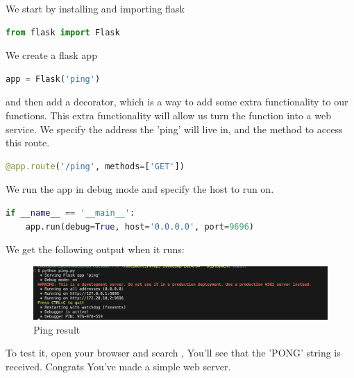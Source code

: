 \documentclass[letterpaper,12pt,notitlepage,twoside]{report}
\begin{document}
We start by installing and importing flask
\begin{lstlisting}[language=python, numbers=none]
from flask import Flask
\end{lstlisting}

We create a flask app
\begin{lstlisting}[language=python, numbers=none]
app = Flask('ping')
\end{lstlisting}

and then add a decorator, which is a way to add some extra functionality to our functions. This extra functionality will allow us turn the function into a web service. We specify the address the 'ping' will live in, and the method to access this route. 
\begin{lstlisting}[language=python, numbers=none]
@app.route('/ping', methods=['GET'])
\end{lstlisting}

We run the app in debug mode and specify the host to run on.
\begin{lstlisting}[language=python, numbers=none]
if __name__ == '__main__':
    app.run(debug=True, host='0.0.0.0', port=9696)
\end{lstlisting}

We get the following output when it runs:
\begin{figure}[h]
	\centering
	\includegraphics[width=\textwidth]{Images/ping.png}
	\caption{Ping result}
	\label{fig:9}
\end{figure}
\FloatBarrier
To test it, open your browser and search , You'll see that the 'PONG' string is received. Congrats You've made a simple web server.
\end{document}

